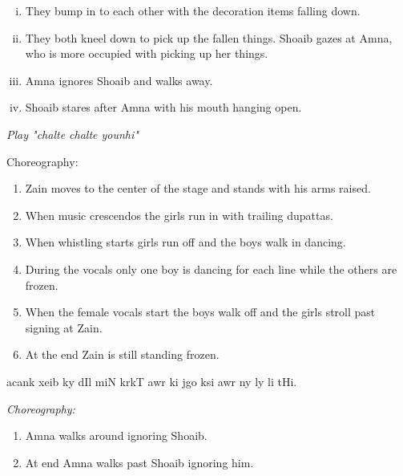\documentclass[a4paper]{article}
\newcommand{\instr}[1]{\vm\hfill\en{\itshape #1}}
\begin{document}
\vspace{0\baselineskip}
	\begin{itemize}
	\end{itemize}

\begin{enpara}
	\itshape
	\begin{enumerate}[(i)]
		\item They bump in to each other with the decoration items falling down.
		\item They both kneel down to pick up the fallen things. Shoaib gazes at Amna, who is more occupied with picking up her things.
		\item Amna ignores Shoaib and walks away.
		\item Shoaib stares after Amna with his mouth hanging open.
	\end{enumerate}
\end{enpara}

\vspace{\baselineskip}
\begin{enpara}
	\itshape
	Play "chalte chalte younhi"

	Choreography:
	\vm
	\begin{enumerate}
		\item Zain moves to the center of the stage and stands with his arms raised.
		\item When music crescendos the girls run in with trailing dupattas.
		\item When whistling starts girls run off and the boys walk in dancing.
		\item During the vocals only one boy is dancing for each line while the others are frozen.
		\item When the female vocals start the boys walk off and the girls stroll past signing at Zain.
		\item At the end Zain is still standing frozen.
	\end{enumerate}
\end{enpara}

\vp
acank xeib ky dIl miN krkT awr  ki jgo ksi awr ny ly li tHi.

\vp
\instr{Play: What is mobile number?}

\begin{enpara}
	\itshape
	Choreography:
	\vm\vm
	\begin{enumerate}
		\item Amna walks around ignoring Shoaib. 
		\item At end Amna walks past Shoaib ignoring him.
	\end{enumerate}
\end{enpara}
\end{document}

